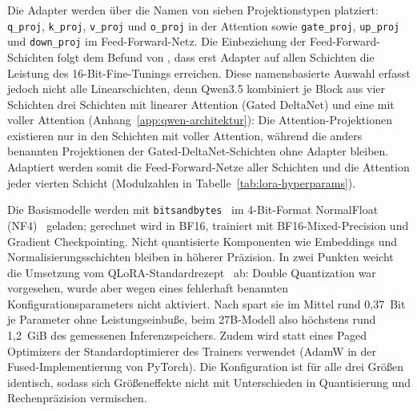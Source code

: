 Die Adapter werden über die Namen von sieben Projektionstypen platziert:
\texttt{q\_proj}, \texttt{k\_proj}, \texttt{v\_proj} und
\texttt{o\_proj} in der Attention sowie \texttt{gate\_proj},
\texttt{up\_proj} und \texttt{down\_proj} im Feed-Forward-Netz.
Die Einbeziehung der Feed-Forward-Schichten folgt dem Befund von
\textcite{dettmers2023qlora}, dass erst Adapter auf allen Schichten die
Leistung des 16-Bit-Fine-Tunings erreichen.
Diese namensbasierte Auswahl erfasst jedoch nicht alle Linearschichten,
denn Qwen3.5 kombiniert je Block aus vier Schichten drei Schichten mit
linearer Attention (Gated DeltaNet) und eine mit voller Attention
(Anhang~\ref{app:qwen-architektur}): Die Attention-Projektionen
existieren nur in den Schichten mit voller Attention, während die anders
benannten Projektionen der Gated-DeltaNet-Schichten ohne Adapter bleiben.
Adaptiert werden somit die Feed-Forward-Netze aller Schichten und die
Attention jeder vierten Schicht (Modulzahlen in
Tabelle~\ref{tab:lora-hyperparams}).

Die Basismodelle werden mit \texttt{bitsandbytes}~\cite{dettmers2022llmint8} im 4-Bit-Format NormalFloat (NF4)~\cite{dettmers2023qlora} geladen;
gerechnet wird in BF16, trainiert mit BF16-Mixed-Precision und Gradient
Checkpointing.
Nicht quantisierte Komponenten wie Embeddings und
Normalisierungsschichten bleiben in höherer Präzision.
In zwei Punkten weicht die Umsetzung vom QLoRA-Standardrezept~\cite{dettmers2023qlora} ab: Double Quantization war vorgesehen, wurde
aber wegen eines fehlerhaft benannten Konfigurationsparameters nicht
aktiviert.
Nach \textcite[Abschn.~3 und~4]{dettmers2023qlora} spart sie im Mittel rund
0,37~Bit je Parameter ohne Leistungseinbuße, beim 27B-Modell also
höchstens rund 1,2~GiB des gemessenen Inferenzspeichers.
Zudem wird statt
eines Paged Optimizers der Standardoptimierer des Trainers verwendet
(AdamW in der Fused-Implementierung von PyTorch).
Die Konfiguration ist für alle drei Größen identisch, sodass sich
Größeneffekte nicht mit Unterschieden in Quantisierung und
Rechenpräzision vermischen.

